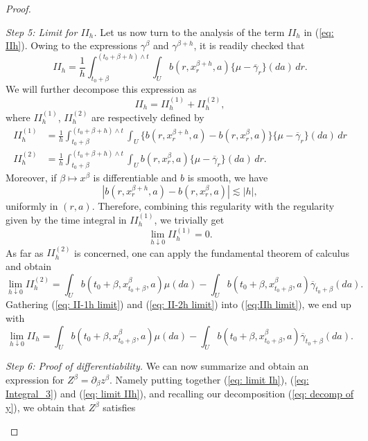 \documentclass[12pt,reqno]{amsart}
\numberwithin{equation}{section}  %
\newcommand{\1}{{\bf 1}}
\newcommand{\2}{{\bf 2}}
\newcommand{\ga}{\gamma}
\theoremstyle{remark}
\theoremstyle{remark}
\begin{document}
\begin{proof}
\begin{enumerate}[wide, labelwidth=!, labelindent=0pt, label=\emph{(\roman*)}]
\smallskip
\noindent
\textit{Step 5: Limit for $II_{h}$.} 
Let us now turn to the analysis of the term $II_{h}$ in (\ref{eq: IIh}). Owing to the expressions $\ga^{\beta}$ and $\ga^{\beta+h}$, it is readily checked that 
\[II_{h}=\frac{1}{h}\int_{t_{0}+\beta}^{(t_{0}+\beta+h)\wedge t}\int_{U}b(r,x_{r}^{\beta+h},a)\{\mu-\overline{\ga}_{r}\}(da)\,dr.\]
We will further decompose this expression as 
\begin{equation}\label{eq:IIh limit}
    II_{h}=II_{h}^{(1)}+II_{h}^{(2)},
\end{equation}
where $II_{h}^{(1)}$, $II_{h}^{(2)}$ are respectively defined by
\begin{align}
    II_{h}^{(1)}&=\frac{1}{h}\int_{t_{0}+\beta}^{(t_{0}+\beta+h)\wedge t}\int_{U}\{b(r,x_{r}^{\beta+h},a)-b(r,x_{r}^{\beta},a)\}\{\mu-\overline{\ga}_{r}\}(da)\,dr\\
    II_{h}^{(2)}&=\frac{1}{h}\int_{t_{0}+\beta}^{(t_{0}+\beta+h)\wedge t}\int_{U}b(r,x_{r}^{\beta},a)\{\mu-\overline{\ga}_{r}\}(da)\,dr.
\end{align}
Moreover, if $\beta\mapsto x^{\beta}$ is differentiable and $b$ is smooth, we have
\[|b(r,x_{r}^{\beta+h},a)-b(r,x_{r}^{\beta},a)|\lesssim|h|,\]
uniformly in $(r,a)$. Therefore, combining this regularity with the regularity given by the time integral in $II_{h}^{(1)}$, we trivially  get
\begin{equation}\label{eq: II-1h limit}
    \lim_{h\downarrow 0}II_{h}^{(1)}=0.
\end{equation}
As far as $II_{h}^{(2)}$ is concerned, one can apply the fundamental theorem of calculus and obtain
\begin{equation}\label{eq: II-2h limit}
    \lim_{h\downarrow 0}II_{h}^{(2)}= \int_{U}b(t_{0}+\beta,x^{\beta}_{t_{0}+\beta},a)\mu(da)-\int_{U}b(t_{0}+\beta,x^{\beta}_{t_{0}+\beta},a)\overline{\ga}_{t_{0}+\beta}(da).
\end{equation}
Gathering (\ref{eq: II-1h limit}) and (\ref{eq: II-2h limit}) into (\ref{eq:IIh limit}), we end up with
\begin{equation}\label{eq: limit IIh}
    \lim_{h\downarrow 0} II_{h}=\int_{U}b(t_{0}+\beta,x^{\beta}_{t_{0}+\beta},a)\mu(da)-\int_{U}b(t_{0}+\beta,x^{\beta}_{t_{0}+\beta},a)\overline{\ga}_{t_{0}+\beta}(da).
\end{equation}

\smallskip
\noindent
\textit{Step 6: Proof of differentiability.} \label{lem 3.8: step 6}
We can now summarize and obtain an expression for $Z^{\beta}=\partial_{\beta}z^{\beta}$. Namely putting together (\ref{eq: limit Ih}), (\ref{eq: Integral_3}) and (\ref{eq: limit IIh}), and recalling our decomposition (\ref{eq: decomp of y}), we obtain that $Z^{\beta}$ satisfies


\end{enumerate}
\end{proof}
\end{document}
